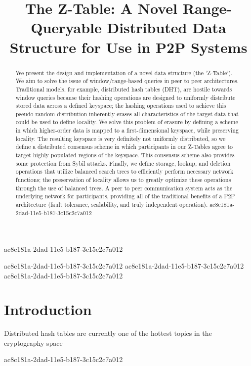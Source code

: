 \documentclass[12pt]{article}
\title{The Z-Table: A Novel Range-Queryable Distributed Data Structure for Use in P2P Systems}
\begin{document}
ac8c181a-2dad-11e5-b187-3c15c2c7a012
\maketitle

\begin{abstract}
We present the design and implementation of a novel data structure (the 'Z-Table'). We aim to solve the issue of window/range-based queries in peer to peer architectures. Traditional models, for example,  distributed hash tables (DHT), are hostile towards window queries because their hashing operations are designed to uniformly distribute stored data across a defined keyspace; the hashing operations used to achieve this pseudo-random distribution inherently erases all characteristics of the target data that could be used to define locality. We solve this problem of erasure by defining a scheme in which higher-order data is mapped to a first-dimensional keyspace, while preserving locality. The resulting keyspace is very definitely not uniformly distributed, so we define a distributed consensus scheme in which participants in our Z-Tables agree to target highly populated regions of the keyspace. This consensus scheme also provides some protection from Sybil attacks. Finally, we define storage, lookup, and deletion operations that utilize balanced search trees to efficiently perform necessary network functions; the preservation of locality allows us to greatly optimize these operations through the use of balanced trees. A peer to peer communication system acts as the underlying network for participants, providing all of the traditional benefits of a P2P architecture (fault tolerance, scalability, and truly independent operation).
ac8c181a-2dad-11e5-b187-3c15c2c7a012\end{abstract}
ac8c181a-2dad-11e5-b187-3c15c2c7a012
ac8c181a-2dad-11e5-b187-3c15c2c7a012
\newpage
ac8c181a-2dad-11e5-b187-3c15c2c7a012\section{Introduction}
Distributed hash tables are currently one of the hottest topics in the cryptography space~\cite{Stoica:2001dj,Rowstron:2001ea,Ratnasamy:2001wn}

ac8c181a-2dad-11e5-b187-3c15c2c7a012\printbibliography
\end{document}
